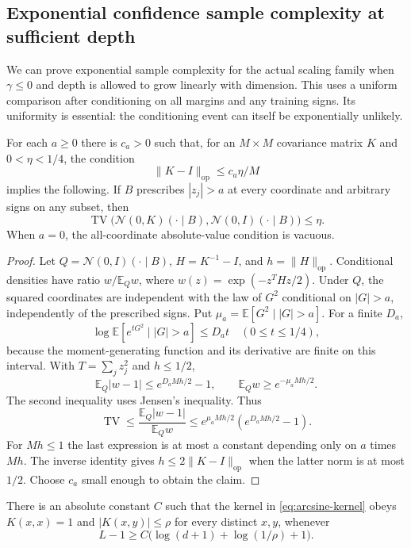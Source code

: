 \subsection{Exponential confidence sample complexity at sufficient depth}

We can prove exponential sample complexity for the actual scaling
family when $\gamma\le0$ and depth is allowed to grow linearly with
dimension. This uses a uniform comparison after conditioning on
all margins and any training signs. Its uniformity is essential:
the conditioning event can itself be exponentially unlikely.

\begin{lemma}
\label{lem:gaussian-comparison}
For each $a\ge0$ there is $c_a>0$ such that, for an $M\times M$
covariance matrix $K$ and $0<\eta<1/4$, the condition
\[
 \|K-I\|_{\mathrm{op}}\le c_a\eta/M
\]
implies the following. If $B$ prescribes $|z_j|>a$ at every coordinate
and arbitrary signs on any subset, then
\[
 \operatorname{TV}\bigl(\mathcal N(0,K)(\cdot\mid B),
                        \mathcal N(0,I)(\cdot\mid B)\bigr)\le\eta.
\]
When $a=0$, the all-coordinate absolute-value condition is vacuous.
\end{lemma}

\begin{proof}
Let $Q=\mathcal N(0,I)(\cdot\mid B)$,
$H=K^{-1}-I$, and $h=\|H\|_{\mathrm{op}}$. Conditional densities have
ratio $w/\mathbb E_Qw$, where $w(z)=\exp(-z^THz/2)$.
Under $Q$, the squared coordinates are independent with the law of
$G^2$ conditional on $|G|>a$, independently of the prescribed signs.
Put $\mu_a=\mathbb E[G^2\mid |G|>a]$. For a finite $D_a$,
\[
 \log\mathbb E[e^{tG^2}\mid |G|>a]\le D_at
 \quad(0\le t\le1/4),
\]
because the moment-generating function and its derivative are finite
on this interval. With $T=\sum_jz_j^2$ and $h\le1/2$,
\[
 \mathbb E_Q|w-1|\le e^{D_aMh/2}-1,
 \qquad \mathbb E_Qw\ge e^{-\mu_aMh/2}.
\]
The second inequality uses Jensen's inequality. Thus
\[
 \operatorname{TV}
 \le\frac{\mathbb E_Q|w-1|}{\mathbb E_Qw}
 \le e^{\mu_aMh/2}(e^{D_aMh/2}-1).
\]
For $Mh\le1$ the last expression is at most a constant depending
only on $a$ times $Mh$. The inverse identity gives
$h\le2\|K-I\|_{\mathrm{op}}$ when the latter norm is at most $1/2$.
Choose $c_a$ small enough to obtain the claim.
\end{proof}

\begin{lemma}
\label{lem:arcsine-decay}
There is an absolute constant $C$ such that the kernel in
\eqref{eq:arcsine-kernel} obeys $K(x,x)=1$ and
$|K(x,y)|\le\rho$ for every distinct $x,y$, whenever
\[
 L-1\ge C\bigl(\log(d+1)+\log(1/\rho)+1\bigr).
\]
\end{lemma}

